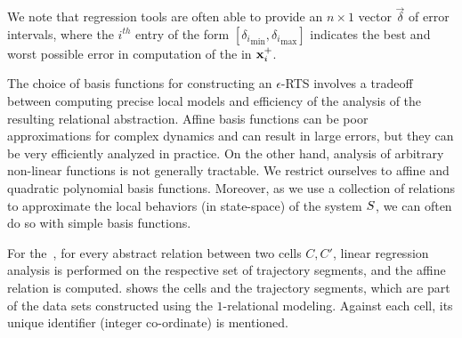 
We note that regression tools are often able to provide an
$n\times 1$ vector $\vec{\delta}$ of error intervals, where the
$i^{th}$ entry of the form $[{\delta_i}_{\min},{\delta_i}_{\max}]$
indicates the best and worst possible error in computation of the
in $\mathbf{x}^{+}_i$.

The choice of basis functions for constructing an $\epsilon$-RTS
involves a tradeoff between computing precise local models and
efficiency of the analysis of the resulting relational abstraction.
Affine basis functions can be poor approximations for complex dynamics
and can result in large errors, but they can be very efficiently
analyzed in practice.  On the other hand, analysis of arbitrary
non-linear functions is not generally tractable. We restrict ourselves
to affine and quadratic polynomial basis functions.  Moreover, as we
use a collection of relations to approximate the local behaviors (in
state-space) of the system $S$, we can often do so with simple
basis functions. 

\begin{example}
    For the~, for every abstract relation between two cells
    $C, C'$, linear regression analysis is performed on the respective
    set of trajectory segments, and the affine relation is computed.
     shows the cells and the trajectory
    segments, which are part of the data sets constructed using the
    $1$-relational modeling. Against each cell, its unique identifier
    (integer co-ordinate) is mentioned.
\end{example}
